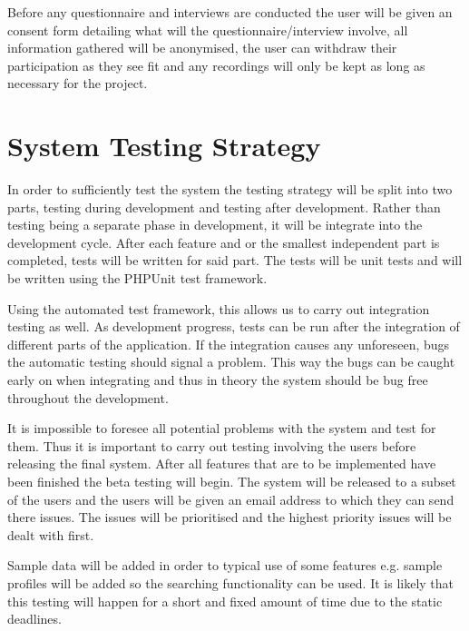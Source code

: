 \documentclass[a4paper,oneside,11pt]{report}
\begin{document}
Before any questionnaire and interviews are conducted the user will be given an consent form detailing what will the questionnaire/interview involve, all information gathered will be anonymised, the user can withdraw their participation as they see fit and any recordings will only be kept as long as necessary for the project.
\section{System Testing Strategy}
In order to sufficiently test the system the testing strategy will be split into two parts, testing during development and testing after development.
Rather than testing being a separate phase in development, it will be integrate into the development cycle. After each feature and or the smallest independent part is completed, tests will be written for said part. The tests will be unit tests and will be written using the PHPUnit test framework. 

Using the automated test framework, this allows us to carry out integration testing as well. As development progress, tests can be run after the integration of different parts of the application. If the integration causes any unforeseen, bugs the automatic testing should signal a problem. This way the bugs can be caught early on when integrating and thus in theory the system should be bug free throughout the development.

It is impossible to foresee all potential problems with the system and test for them. Thus it is important to carry out testing involving the users before releasing  the final system. After all features that are to be implemented have been finished the beta testing will begin. The system will be released to a subset of the users and the users will be given an email address to which they can send there issues. The issues will be prioritised and the highest priority issues will be dealt with first.

Sample data will be added in order to typical use of some features e.g. sample profiles will be added so the searching functionality can be used. It is likely that this testing will happen for a short and fixed amount of time due to the static deadlines.	
\end{document}
